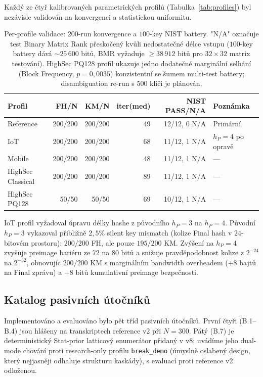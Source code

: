 \documentclass[11pt,a4paper]{article}
\begin{document}
Každý ze čtyř kalibrovaných parametrických profilů (Tabulka~\ref{tab:profiles}) byl nezávisle validován na konvergenci a statistickou uniformitu.

\begin{table}[ht]
\centering
\small
\begin{tabular}{lrrrrl}
\toprule
Profil & FH/N & KM/N & iter(med) & NIST PASS/N/A & Poznámka \\
\midrule
Reference & 200/200 & 200/200 & 49 & 12/12, 0 N/A & Primární \\
IoT & 200/200 & 200/200 & 68 & 11/12, 1 N/A & $h_P=4$ po opravě \\
Mobile & 200/200 & 200/200 & 48 & 11/12, 1 N/A & --- \\
HighSec Classical & 200/200 & 200/200 & 89 & 11/12, 1 N/A & --- \\
HighSec PQ128 & 50/50 & 50/50 & 69 & 10/12, 1 N/A & --- \\
\bottomrule
\end{tabular}
\caption{Per-profile validace: $200$-run konvergence a $100$-key NIST battery. "N/A" označuje test Binary Matrix Rank přeskočený kvůli nedostatečné délce vstupu ($100$-key battery dává $\sim 25\,600$ bitů, BMR vyžaduje $\geq 38\,912$ bitů pro $32 \times 32$ matrix testování). HighSec PQ128 profil ukazuje jedno dodatečné marginální selhání (Block Frequency, $p = 0{,}0035$) konzistentní se šumem multi-test battery; disambiguation re-run s $500$ klíči je plánován.}
\label{tab:profiles-validation}
\end{table}

IoT profil vyžadoval úpravu délky hashe z původního $h_P = 3$ na $h_P = 4$. Původní $h_P = 3$ vykazoval přibližně $2{,}5\%$ silent key mismatch (kolize Final hash v $24$-bitovém prostoru): $200/200$ FH, ale pouze $195/200$ KM. Zvýšení na $h_P = 4$ zvyšuje preimage bariéru ze $72$ na $80$ bitů a snižuje pravděpodobnost kolize z $2^{-24}$ na $2^{-32}$, obnovujíc $200/200$ KM s marginálním bandwidth overheadem ($+8$ bajtů na Final zprávu) a $+8$ bitů kumulativní preimage bezpečnosti.

\subsection{Katalog pasivních útočníků}\label{sec:empirical-attackers}

Implementováno a evaluováno bylo pět tříd pasivních útočníků. První čtyři (B.1--B.4) jsou hlášeny na transkriptech reference v2 při $N = 300$. Pátý (B.7) je deterministický Stat-prior latticový enumerátor přidaný v v8; uvádíme jeho dual-mode chování proti research-only profilu \texttt{break\_demo} (úmyslně oslabený design, který nejjasněji odhaluje strukturu kaskády), s evaluací proti reference v2 odloženou.
\end{document}
